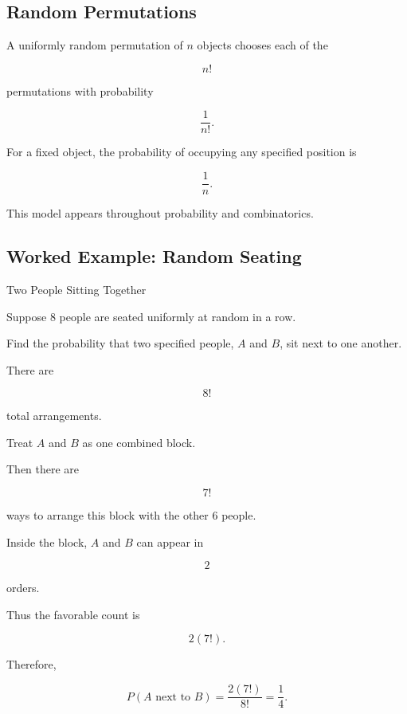 \subsection{Random Permutations}
\label{subsec:elementary-random-permutations}

A uniformly random permutation of \(n\) objects chooses each of the

\[
n!
\]

permutations with probability

\[
\boxed{
\frac1{n!}.
}
\]

For a fixed object, the probability of occupying any specified position
is

\[
\boxed{
\frac1n.
}
\]

This model appears throughout probability and combinatorics.

\subsection{Worked Example: Random Seating}
\label{subsec:worked-random-seating}

\begin{workedexamplebox}{Two People Sitting Together}

Suppose \(8\) people are seated uniformly at random in a row.

Find the probability that two specified people, \(A\) and \(B\), sit
next to one another.

There are

\[
8!
\]

total arrangements.

Treat \(A\) and \(B\) as one combined block.

Then there are

\[
7!
\]

ways to arrange this block with the other \(6\) people.

Inside the block, \(A\) and \(B\) can appear in

\[
2
\]

orders.

Thus the favorable count is

\[
2(7!).
\]

Therefore,

\begin{answerbox}
\[
\boxed{
P(A\text{ next to }B)
=
\frac{2(7!)}{8!}
=
\frac14.
}
\]
\end{answerbox}

\end{workedexamplebox}

